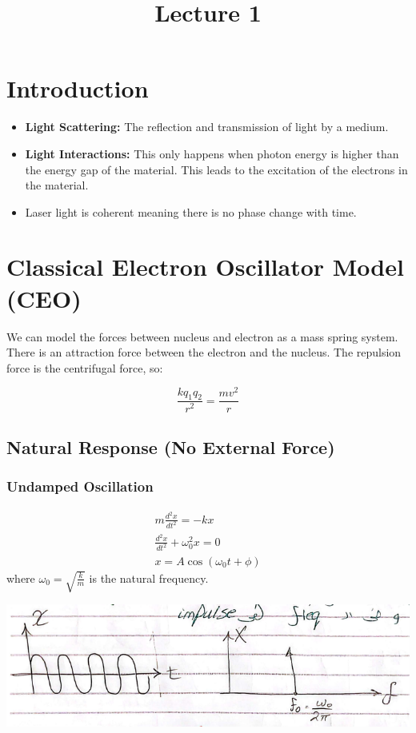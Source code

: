 \documentclass[11pt]{article}
\title{Lecture 1}
\author{}
\date{}
\begin{document}
\maketitle

\section{Introduction}
\begin{itemize}
    \item \textbf{Light Scattering:}  The reflection and transmission of light by a medium.
    \item \textbf{Light Interactions:}  This only happens when photon energy is higher than the energy gap of the material. This leads to the excitation of the electrons in the material.
    \item Laser light is coherent meaning there is no phase change with time.
\end{itemize}

\section{Classical Electron Oscillator Model (CEO)}
We can model the forces between nucleus and electron as a mass spring system. There is an attraction force between the electron and the nucleus. The repulsion force is the centrifugal force, so:

\begin{equation*}
    \frac{kq_1q_2}{r^2} = \frac{mv^2}{r}
\end{equation*}

\subsection{Natural Response (No External Force)}
\subsubsection{Undamped Oscillation}
\begin{align*}
    m\frac{d^2x}{dt^2} = -kx \\
    \frac{d^2x}{dt^2} + \omega_0^2 x = 0 \\
    x = A\cos(\omega_0 t + \phi)
\end{align*}
where $\omega_0 = \sqrt{\frac{k}{m}}$ is the natural frequency.

\begin{center}
    \includegraphics[scale=0.8]{1.png}
\end{center}
\end{document}
